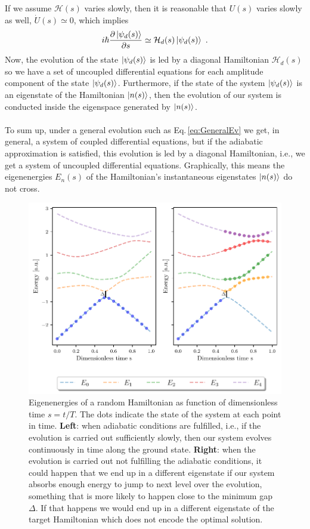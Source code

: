 If we assume $\mathcal{H}(s)$ varies slowly, then it is reasonable that $U(s)$ varies slowly as well, $\dot{U}(s) \simeq 0$, which implies
\begin{equation}
    i\hbar  \frac{\partial \ket{\psi_{d}(s)}}{\partial s} \simeq \mathcal{H}_{d}(s)\ket{\psi_{d}(s)}\ .
\end{equation}
Now, the evolution of the state $\ket{\psi_{d}(s)}$ is led by a diagonal Hamiltonian $\mathcal{H}_{d}(s)$ so we have a set of uncoupled differential equations for each amplitude component of the state $\ket{\psi_{d}(s)}$. Furthermore, if the state of the system $\ket{\psi_{d}(s)}$ is an eigenstate of the Hamiltonian $\ket{n(s)}$, then the evolution of our system is conducted inside the eigenspace generated by $\ket{n(s)}$.\\\\
To sum up, under a general evolution such as Eq.\,\eqref{eq:GeneralEv} we get, in general, a system of coupled differential equations, but if the adiabatic approximation is satisfied, this evolution is led by a diagonal Hamiltonian, i.e., we get a system of uncoupled differential equations. Graphically, this means the eigenenergies $E_{n}(s)$ of the Hamiltonian's instantaneous eigenstates $\ket{n(s)}$ do not cross.
\begin{figure}[H]
\centering
\includegraphics[width=\textwidth]{Figures/Eigenenergies.pdf}
    \caption{Eigenenergies of a random Hamiltonian as function of dimensionless time $s=t/T$. The dots indicate the state of the system at each point in time. \textbf{Left}: when adiabatic conditions are fulfilled, i.e., if the evolution is carried out sufficiently slowly, then our system evolves continuously in time along the ground state. \textbf{Right}: when the evolution is carried out not fulfilling the adiabatic conditions, it could happen that we end up in a different eigenstate if our system absorbs enough energy to jump to next level over the evolution, something that is more likely to happen close to the minimum gap $\Delta$. If that happens we would end up in a different eigenstate of the target Hamiltonian which does not encode the optimal solution.}
    \label{fig:Eigenenergies}
\end{figure}
